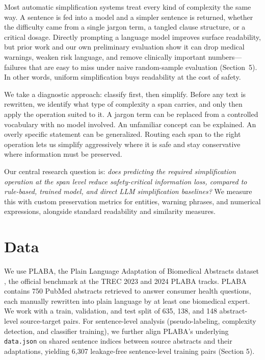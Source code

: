\documentclass[11pt]{article}
\begin{document}
Most automatic simplification systems treat every kind of complexity the same
way. A sentence is fed into a model and a simpler sentence is returned, whether
the difficulty came from a single jargon term, a tangled clause structure, or a
critical dosage. Directly prompting a language model improves surface readability, but prior
work and our own preliminary evaluation show it can drop medical warnings,
weaken risk language, and remove clinically important numbers---failures that are easy to miss under naive random-sample evaluation (Section~5). In other words, uniform simplification
buys readability at the cost of safety.

We take a diagnostic approach: classify first, then simplify. Before any text is
rewritten, we identify what type of complexity a span carries, and only then
apply the operation suited to it. A jargon term can be replaced from a
controlled vocabulary with no model involved. An unfamiliar concept can be
explained. An overly specific statement can be generalized. Routing each span to
the right operation lets us simplify aggressively where it is safe and stay
conservative where information must be preserved.

Our central research question is: \emph{does predicting the required
simplification operation at the span level reduce safety-critical information
loss, compared to rule-based, trained model, and direct LLM simplification
baselines?} We measure this with custom preservation metrics for entities,
warning phrases, and numerical expressions, alongside standard readability and
similarity measures.

\section{Data}

We use PLABA, the Plain Language Adaptation of Biomedical Abstracts dataset
\citep{attal2023plaba}, the official benchmark at the TREC 2023 and 2024 PLABA
tracks. PLABA contains 750 PubMed abstracts retrieved to answer consumer health
questions, each manually rewritten into plain language by at least one
biomedical expert. We work with a train, validation, and test split of 635,
138, and 148 abstract-level source-target pairs. For sentence-level analysis
(pseudo-labeling, complexity detection, and classifier training), we further
align PLABA's underlying \texttt{data.json} on shared sentence indices between
source abstracts and their adaptations, yielding 6{,}307 leakage-free
sentence-level training pairs (Section 5).
\end{document}
